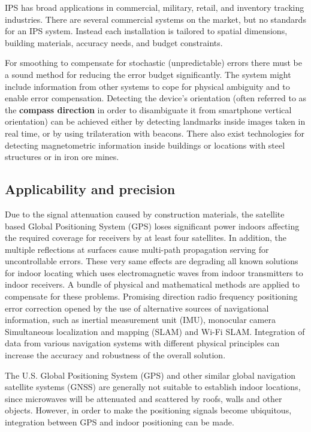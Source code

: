 \documentclass{ipgpmaster}
\begin{document}
IPS has broad applications in commercial, military, retail, and inventory tracking industries. There are several commercial systems on the market, but no standards for an IPS system. Instead each installation is tailored to spatial dimensions, building materials, accuracy needs, and budget constraints.

For smoothing to compensate for stochastic (unpredictable) errors there must be a sound method for reducing the error budget significantly. The system might include information from other systems to cope for physical ambiguity and to enable error compensation. Detecting the device's orientation (often referred to as the \textbf{compass direction} in order to disambiguate it from smartphone vertical orientation) can be achieved either by detecting landmarks inside images taken in real time, or by using trilateration with beacons. There also exist technologies for detecting magnetometric information inside buildings or locations with steel structures or in iron ore mines.

 

\subsection{Applicability and precision}

Due to the signal attenuation caused by construction materials, the satellite based Global Positioning System (GPS) loses significant power indoors affecting the required coverage for receivers by at least four satellites. In addition, the multiple reflections at surfaces cause multi-path propagation serving for uncontrollable errors. These very same effects are degrading all known solutions for indoor locating which uses electromagnetic waves from indoor transmitters to indoor receivers. A bundle of physical and mathematical methods are applied to compensate for these problems. Promising direction radio frequency positioning error correction opened by the use of alternative sources of navigational information, such as inertial measurement unit (IMU), monocular camera Simultaneous localization and mapping (SLAM) and Wi-Fi SLAM. Integration of data from various navigation systems with different physical principles can increase the accuracy and robustness of the overall solution.

The U.S. Global Positioning System (GPS) and other similar global navigation satellite systems (GNSS) are generally not suitable to establish indoor locations, since microwaves will be attenuated and scattered by roofs, walls and other objects. However, in order to make the positioning signals become ubiquitous, integration between GPS and indoor positioning can be made.
\end{document}
